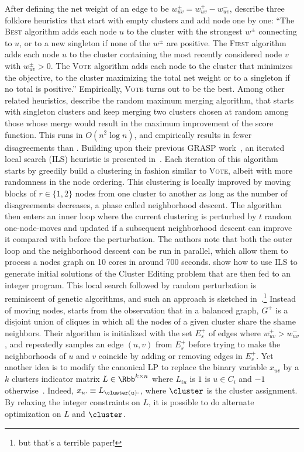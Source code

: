 After defining the net weight of an edge to be $w^\pm_{uv} = w^+_{uv} - w^-_{uv}$,
\textcite{Elsner2009} describe three folklore heuristics that start with empty clusters and add node
one by one: \enquote{The \textsc{Best} algorithm adds each node $u$ to the cluster with the
strongest $w^\pm$ connecting to $u$, or to a new singleton if none of the $w^\pm$ are positive.
The \textsc{First} algorithm adds each node $u$ to the cluster containing the most recently
considered node $v$ with $w^\pm_{uv} > 0$. The \textsc{Vote} algorithm adds each node to the cluster
that minimizes the \pcc{} objective, \ie{} to the cluster maximizing the total net weight
or to a singleton if no total is positive.} Empirically, \textsc{Vote} turns out to be the best.
Among other related heuristics, \textcite{mergingHeuristics14} describe the random maximum merging
algorithm, that starts with singleton clusters and keep merging two clusters chosen at random among
those whose merge would result in the maximum improvement of the score function. This runs in
$O(n^2\log n)$, and empirically results in fewer disagreements than \ccpivot{}.
Building upon their previous GRASP work~\autocite{GRASP13}, an iterated local search (ILS) heuristic is
presented in~\autocites{Levorato2015}{Levorato2017}. Each iteration of this algorithm starts by
greedily build a clustering in fashion similar to \textsc{Vote}, albeit with more randomness in the
node ordering. This clustering is locally improved by moving blocks of $r\in\{1,2\}$ nodes from one
cluster to another as long as the number of disagreements decreases, a phase called neighborhood
descent. The algorithm then enters an inner loop where the current clustering is perturbed by $t$
random one-node-moves and updated if a subsequent neighborhood descent can improve it compared with
before the perturbation. The authors note that both the outer loop and the neighborhood descent can
be run in parallel, which allow them to process a  nodes graph on 10 cores in around 700
seconds. \Textcite{heuristicCE16} show how to use ILS to generate initial solutions of the Cluster
Editing problem that are then fed to an integer program.
This local search followed by random perturbation is reminiscent of genetic algorithms, and such an
approach is sketched in~\autocite{GeneticCC08}.\footnote{but that's a terrible paper!} Instead of
moving nodes, \textcite{restoreNeighborhood13} starts from the observation that in a balanced
graph, $G^+$ is a disjoint union of cliques in which all the nodes of a given cluster share the shame
neighbors. Their algorithm is initialized with the set $E_s^+$ of edges where $w^+_{uv} > w^-_{uv}$,
and repeatedly samples an edge $(u,v)$ from $E_s^+$ before trying to make the neighborhoods of $u$
and $v$ coincide by adding or removing edges in $E_s^+$.  Yet another idea is to modify the
canonical LP to replace the binary variable $x_{uv}$ by a $k$ clusters indicator matrix
$L\in\Rbb^{k\times n}$ where $L_{iu}$ is $1$ is $u\in C_i$ and $-1$
otherwise~\autocite{AltOptimLP13}. Indeed, $x_{u\cdot} \equiv L_{\cluster(u)\cdot}$, where $\cluster$
is the cluster assignment. By relaxing the integer constraints on $L$, it is possible to do
alternate optimization on $L$ and $\cluster$.

